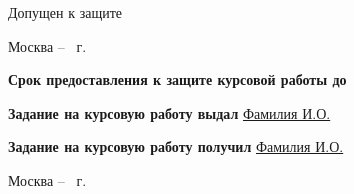 \documentclass[14pt, a4paper, titlepage]{extarticle}
\begin{document}
\begin{titlepage}
    Допущен к защите \hfill\datePlace \\
    \begin{center}
        \vfill{}Москва -- \the\year{}~г.
    \end{center}
    \newpage
    \noindent\textbf{Срок предоставления к защите курсовой работы до} {\raggedright\datePlace} \par
    \noindent\textbf{Задание на курсовую работу выдал} \uline{Фамилия И.О.} \hfill\signaturePlace \par
    \hfill\datePlace \par
    \noindent\textbf{Задание на курсовую работу получил} \uline{Фамилия И.О.} \hfill\signaturePlace \par\bigskip
    \begin{center}
        Москва -- \the\year{}~г.
    \end{center}
\end{titlepage}
\addtocounter{page}{2}
\end{document}
